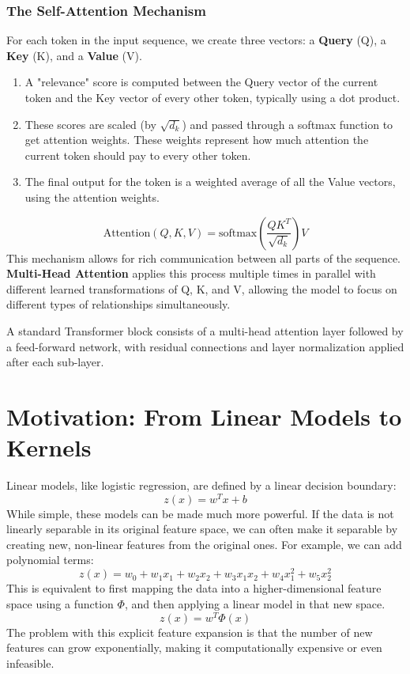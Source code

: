 \documentclass{article}
\begin{document}
\begin{multicols}{2}
\subsubsection{The Self-Attention Mechanism}
For each token in the input sequence, we create three vectors: a \textbf{Query} (Q), a \textbf{Key} (K), and a \textbf{Value} (V).
\begin{enumerate}
    \item A "relevance" score is computed between the Query vector of the current token and the Key vector of every other token, typically using a dot product.
    \item These scores are scaled (by $\sqrt{d_k}$) and passed through a softmax function to get attention weights. These weights represent how much attention the current token should pay to every other token.
    \item The final output for the token is a weighted average of all the Value vectors, using the attention weights.
\end{enumerate}
$$ \text{Attention}(Q, K, V) = \text{softmax}\left(\frac{QK^T}{\sqrt{d_k}}\right)V $$
This mechanism allows for rich communication between all parts of the sequence. \textbf{Multi-Head Attention} applies this process multiple times in parallel with different learned transformations of Q, K, and V, allowing the model to focus on different types of relationships simultaneously.

A standard Transformer block consists of a multi-head attention layer followed by a feed-forward network, with residual connections and layer normalization applied after each sub-layer.

\section{Motivation: From Linear Models to Kernels}
Linear models, like logistic regression, are defined by a linear decision boundary:
$$ z(x) = w^T x + b $$
While simple, these models can be made much more powerful. If the data is not linearly separable in its original feature space, we can often make it separable by creating new, non-linear features from the original ones. For example, we can add polynomial terms:
$$ z(x) = w_0 + w_1 x_1 + w_2 x_2 + w_3 x_1 x_2 + w_4 x_1^2 + w_5 x_2^2 $$
This is equivalent to first mapping the data into a higher-dimensional feature space using a function $\Phi$, and then applying a linear model in that new space.
$$ z(x) = w^T \Phi(x) $$
The problem with this explicit feature expansion is that the number of new features can grow exponentially, making it computationally expensive or even infeasible.


\end{multicols}
\end{document}
